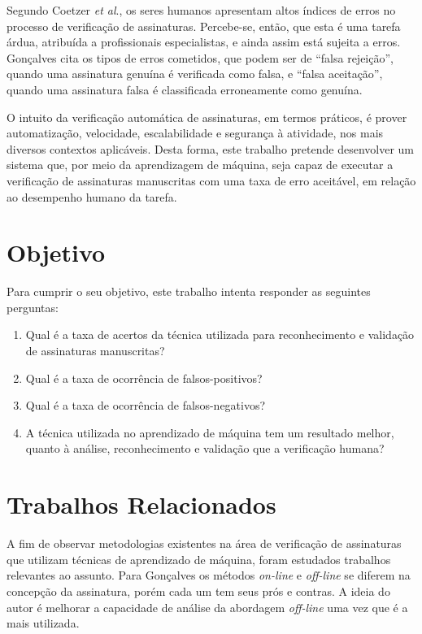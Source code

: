\documentclass[12pt]{article}
\begin{document}
		Segundo Coetzer \textit{et al}.\cite{coetzer2006}, os seres humanos apresentam altos índices de erros no processo de verificação de 		assinaturas. Percebe-se, então, que esta é uma tarefa árdua, atribuída a profissionais especialistas, e ainda assim está sujeita a erros. Gonçalves\cite{goncalves2008} cita os tipos de erros cometidos, que podem ser de ``falsa rejeição'', quando uma assinatura genuína é verificada como falsa, e ``falsa aceitação'', quando uma assinatura falsa é classificada erroneamente como genuína.
		
		O intuito da verificação automática de assinaturas, em termos práticos, é prover automatização, velocidade, escalabilidade e segurança à atividade, nos mais diversos contextos aplicáveis. Desta forma, este trabalho pretende desenvolver um sistema que, por meio da aprendizagem de máquina, seja capaz de executar a verificação de assinaturas manuscritas com uma taxa de erro aceitável, em relação ao desempenho humano da tarefa.

	\section{Objetivo}
		Para cumprir o seu objetivo, este trabalho intenta responder as seguintes perguntas:
		
		\begin{enumerate}
			\item Qual é a taxa de acertos da técnica utilizada para reconhecimento e validação de assinaturas manuscritas?
			\item Qual é a taxa de ocorrência de falsos-positivos?
			\item Qual é a taxa de ocorrência de falsos-negativos?
			\item A técnica utilizada no aprendizado de máquina tem um resultado melhor, quanto à análise, reconhecimento e validação que a verificação humana?
		\end{enumerate}
	
	\section{Trabalhos Relacionados}
			A fim de observar metodologias existentes na área de verificação de assinaturas que utilizam técnicas de aprendizado de máquina, foram estudados trabalhos relevantes ao assunto. Para Gonçalves\cite{goncalves2008} os métodos \textit{on-line} e \textit{off-line} se diferem na concepção da assinatura, porém cada um tem seus prós e contras. A ideia do autor é melhorar a capacidade de análise da abordagem \textit{off-line} uma vez que é a mais utilizada.
			
\end{document}
